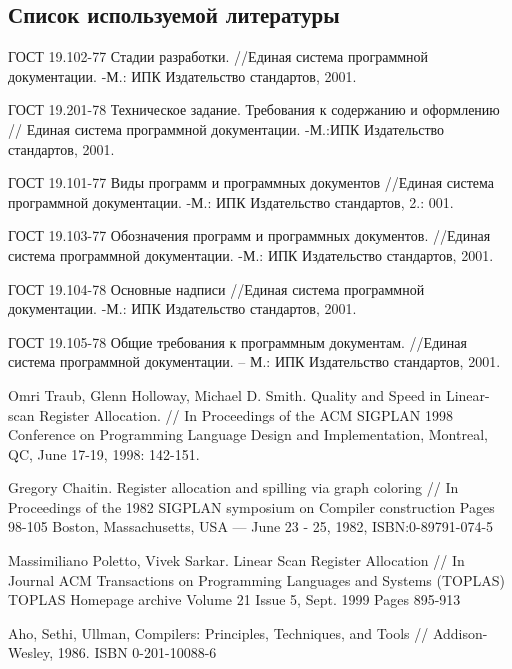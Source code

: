 \subsection{Список используемой литературы}
\begin{my_enumerate}

\item
ГОСТ 19.102-77 Стадии разработки. //Единая система программной документации. -М.: ИПК Издательство стандартов, 2001. \\

\item
ГОСТ 19.201-78 Техническое задание. Требования к содержанию и оформлению // Единая система программной документации. -М.:ИПК Издательство стандартов, 2001. \\

\item
ГОСТ 19.101-77 Виды программ и программных документов
//Единая система программной документации. -М.: ИПК Издательство стандартов, 2.: 001. \\

\item
ГОСТ 19.103-77 Обозначения программ и программных документов. //Единая система программной документации. -М.: ИПК Издательство стандартов, 2001. \\

\item
ГОСТ 19.104-78 Основные надписи //Единая система программной документации. -М.: ИПК Издательство стандартов, 2001. \\

\item 
ГОСТ 19.105-78 Общие требования к программным документам. //Единая система
программной документации. – М.: ИПК Издательство стандартов, 2001. \\

\item
Omri Traub, Glenn Holloway, Michael D. Smith. Quality and Speed in Linear-scan Register Allocation. // In Proceedings of the ACM SIGPLAN 1998 Conference on Programming Language Design and Implementation, Montreal, QC, June 17-19, 1998: 142-151. \\

\item
Gregory Chaitin. Register allocation and spilling via graph coloring // In Proceedings of the 1982 SIGPLAN symposium on Compiler construction Pages 98-105  Boston, Massachusetts, USA — June 23 - 25, 1982, ISBN:0-89791-074-5 \\

\item 	Massimiliano Poletto, Vivek Sarkar. Linear Scan Register Allocation // In Journal
ACM Transactions on Programming Languages and Systems (TOPLAS) TOPLAS Homepage archive
Volume 21 Issue 5, Sept. 1999 Pages 895-913 \\

\item
Aho, Sethi, Ullman, Compilers: Principles, Techniques, and Tools // Addison-Wesley, 1986. ISBN 0-201-10088-6 \\


\end{my_enumerate}

